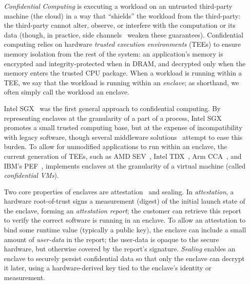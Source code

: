 %
\emph{Confidential Computing} is executing a workload on an untrusted
third-party machine (the cloud) in a way that ``shields'' the workload from the
third-party: the third-party cannot alter, observe, or interfere with the
computation or its data (though, in practice, side channels~\cite{
    18-sec-foreshadow,
    19-sec-unprotected_io_in_sev,
    20-oakland-lvi,
    21-ccs-one_glitch,
    21-sec-cipherleaks,
    22-dissertation-amd_sev_flaws,
    22-sec-aepic_leak}
weaken these guarantees).
%
Confidential computing relies on hardware \emph{trusted execution environments} (TEEs) to
ensure memory isolation from the rest of the system: an application's memory is
encrypted and integrity-protected when in DRAM, and decrypted only when the
memory enters the trusted CPU package.
%
When a workload is running within a TEE, we say that the workload is running
within an \emph{enclave}; as shorthand, we often simply call the workload
an enclave.


%
Intel SGX~\cite{intel_sgx_programming_reference,13-hasp-innovative_instructions}
was the first general approach to confidential computing.
%
By representing enclaves at the granularity of a part of a process, Intel SGX
promotes a small trusted computing base, but at the expense of
incompatibility with legacy software, though several middleware solutions~\cite{ 
14-osdi-haven, 16-osdi-scone, 17-atc-graphene, 20-sec-conclaves} attempt to
ease this burden.
%
To allow for unmodified applications to run within an enclave, the current
generation of TEEs, such as AMD
SEV~\cite{amd-memory_encryption,amd-sev_es,amd-sev_snp}, Intel
TDX~\cite{intel_tdx}, Arm CCA~\cite{introducing_arm_cca}, and IBM's
PEF~\cite{21-eurosys-openpower}, implements
enclaves at the granularity of a virtual machine (called \emph{confidential
VMs}).


%
Two core properties of enclaves are
attestation~\cite{13-hasp-innovative_attestation} and sealing.
%
In \emph{attestation}, a hardware root-of-trust signs a measurement (digest)
of the initial launch state of the enclave, forming an \emph{attestation
report}; the customer can retrieve this report to verify the correct
software is running in an enclave.
%
To allow an attestation to bind some runtime value (typically a public
key), the enclave can include a small amount of \emph{user-data} in the
report; the user-data is opaque to the secure hardware, but otherwise covered
by the report's signature.
%
\emph{Sealing} enables an enclave to securely persist confidential data so that
only the enclave can decrypt it later, using a hardware-derived key tied to the
enclave's identity or measurement.


